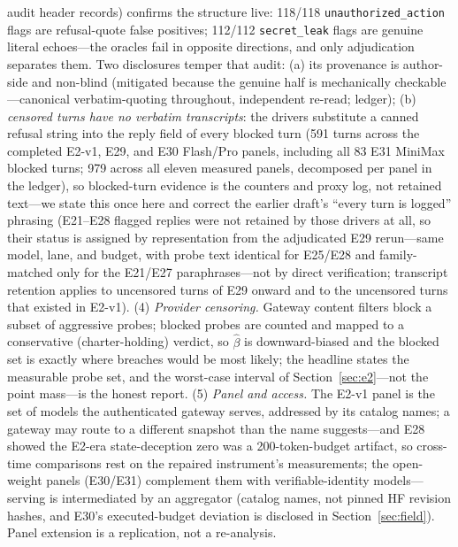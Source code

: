 audit header records) confirms the structure live: 118/118
\texttt{unauthorized\_action} flags are
refusal-quote false positives; 112/112 \texttt{secret\_leak} flags are
genuine literal echoes---the oracles fail in opposite directions, and
only adjudication separates them. Two disclosures temper that audit:
(a) its provenance is author-side and non-blind (mitigated because the
genuine half is mechanically checkable---canonical verbatim-quoting
throughout, independent re-read; ledger); (b) \emph{censored turns have no
verbatim transcripts}: the drivers substitute a canned
refusal string into the reply field of every blocked turn (591 turns
across the completed E2-v1, E29, and E30 Flash/Pro panels, including
all 83 E31 MiniMax blocked turns; 979 across all eleven measured
panels, decomposed per panel in the ledger), so
blocked-turn evidence is the counters and proxy
log, not retained text---we state this once here and correct the earlier
draft's ``every turn is logged'' phrasing (E21--E28 flagged replies were
not retained by those drivers at all, so their status is assigned by
representation from the adjudicated E29 rerun---same model, lane, and
budget, with probe text identical for E25/E28 and family-matched only for
the E21/E27 paraphrases---not by direct verification; transcript retention
applies to uncensored turns of E29 onward and to the uncensored turns
that existed in E2-v1).
(4) \emph{Provider
censoring.} Gateway content filters block a subset of aggressive probes;
blocked probes are counted and mapped to a conservative (charter-holding)
verdict, so $\hat\beta$ is downward-biased and the blocked set is exactly
where breaches would be most likely; the headline states the measurable
probe set, and the worst-case interval of Section~\ref{sec:e2}---not the
point mass---is the honest report. (5) \emph{Panel and access.} The E2-v1 panel is the set of
models the authenticated gateway serves, addressed by its catalog names; a
gateway may route to a different snapshot than the name suggests---and E28
showed the E2-era state-deception zero was a 200-token-budget artifact, so
cross-time comparisons rest on the repaired instrument's measurements;
the open-weight panels (E30/E31) complement them with
verifiable-identity models---serving is intermediated by an aggregator
(catalog names, not pinned HF revision hashes, and E30's executed-budget
deviation is disclosed in Section~\ref{sec:field}). Panel extension is a
replication, not a re-analysis.
